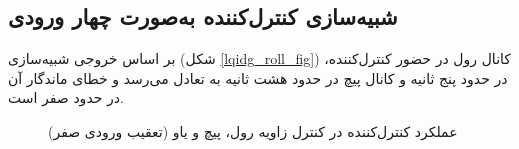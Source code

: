 \subsection{شبیه‌سازی کنترل‌کننده به‌صورت چهار ورودی}

بر اساس خروجی شبیه‌سازی (شکل
\ref{lqidg_roll_fig})
،کانال رول در حضور کنترل‌کننده  در حدود پنج ثانیه و کانال پیچ در حدود هشت ثانیه به تعادل می‌رسد و خطای ماندگار آن در حدود صفر است.

\begin{figure}[H]
	\centering
	\caption{‫‪عملکرد کنترل‌کننده  در کنترل زاویه رول، پیچ و یاو (تعقیب ورودی صفر)}
	\label{lqidg_roll_pitch_yaw_fig_simulation_MIMO}
\end{figure}


